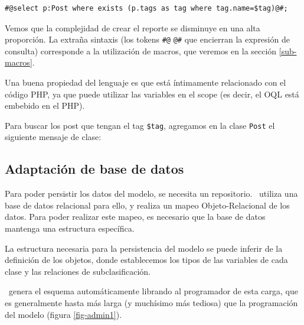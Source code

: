 \begin{verbatim}
#@select p:Post where exists (p.tags as tag where tag.name=$tag)@#;
\end{verbatim}

Vemos que la complejidad de crear el reporte se disminuye en una alta proporción.
La extraña sintaxis (los tokens \verb"#@" \verb"@#" que encierran la expresión de consulta) corresponde a la utilización de macros, que veremos en la sección \ref{sub-macros}.

Una buena propiedad del lenguaje es que está íntimamente relacionado con el código PHP, ya que puede utilizar las variables en el scope (es decir, el OQL está embebido en el PHP).

Para buscar los post que tengan el tag  \verb"$tag", %
agregamos en la clase \verb"Post" el siguiente mensaje de clase:


\subsection{Adaptación de base de datos}
\label{sub-adapt}

Para poder persistir los datos del modelo, se necesita un repositorio. \PWB\ utiliza una base de datos relacional para ello, y realiza un mapeo Objeto-Relacional de los datos. Para poder realizar este mapeo, es necesario que la base de datos mantenga una estructura específica.

La estructura necesaria para la persistencia del modelo se puede inferir de la definición de los objetos, donde establecemos los tipos de las variables de cada clase y las relaciones de subclasificación.

\PWB \ genera el esquema automáticamente librando al programador de esta carga, que es generalmente hasta más larga (y muchísimo más tediosa) que la programación del modelo (figura \ref{fig-admin1}).

